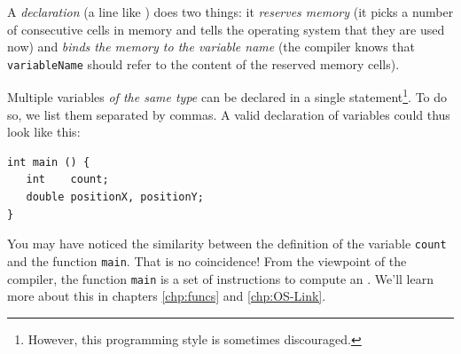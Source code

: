 A \emph{declaration} (\ie a line like ) does two things: it \emph{reserves memory} (\ie it picks a number of consecutive cells in memory and tells the operating system that they are used now) and \emph{binds the memory to the variable name} (\ie the compiler knows that \texttt{variableName} should refer to the content of the reserved memory cells).

Multiple variables \emph{of the same type} can be declared in a single statement\footnote{However, this programming style is sometimes discouraged.}. To do so, we list them separated by commas. A valid declaration of variables could thus look like this:
\begin{codebox}[declarations.c]
\begin{verbatim}
int main () {
   int    count;
   double positionX, positionY;
}
\end{verbatim}
 \label{code:declaringVars}
\end{codebox}

You may have noticed the similarity between the definition of the variable \texttt{count} and the function \texttt{main}. That is no coincidence! From the viewpoint of the compiler, the function \texttt{main} is a set of instructions to compute an . We'll learn more about this in chapters \ref{chp:funcs} and \ref{chp:OS-Link}.

